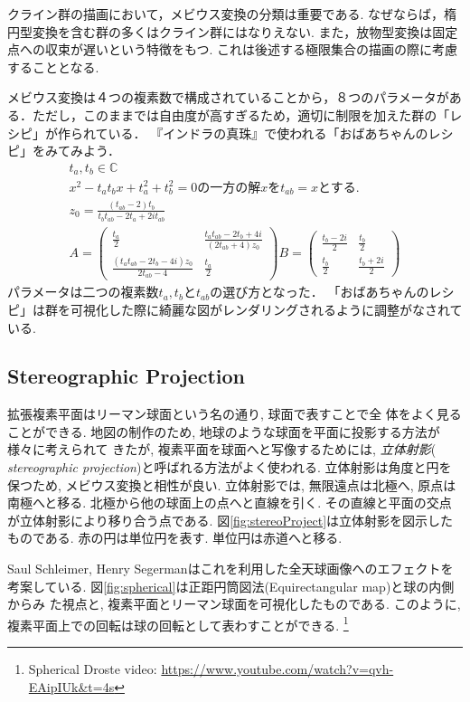 クライン群の描画において，メビウス変換の分類は重要である.
なぜならば，楕円型変換を含む群の多くはクライン群にはなりえない.
また，放物型変換は固定点への収束が遅いという特徴をもつ.
これは後述する極限集合の描画の際に考慮することとなる.

メビウス変換は４つの複素数で構成されていることから，８つのパラメータがある．ただし，このままでは自由度が高すぎるため，適切に制限を加えた群の「レシピ」が作られている．
『インドラの真珠』で使われる「おばあちゃんのレシピ」をみてみよう．
\begin{eqnarray*}
 t_a, t_b \in \mathbb{C} \\
 x^2 - t_a t_b x + t_a^2 + t_b^2 = 0 \text{の一方の解}x\text{を}t_{ab} = x \text{とする. }\\
 z_0 = \frac{(t_{ab} -2)t_b}{t_b t_{ab} - 2 t_a + 2it_{ab}}\\
 A = \left(
      \begin{array}{ccc}
       \frac{t_a}{2} & \frac{t_a t_{ab} - 2 t_b + 4i}{(2 t_{ab} + 4)z_0} \\
       \frac{(t_a t_{ab} - 2 t_b -4i)z_0}{2 t_{ab} - 4} & \frac{t_a}{2}
      \end{array}
     \right)
 B = \left(
      \begin{array}{ccc}
       \frac{t_b - 2i}{2} & \frac{t_b}{2} \\
       \frac{t_b}{2} & \frac{t_b + 2i}{2}
      \end{array}
     \right)
\end{eqnarray*}
パラメータは二つの複素数$t_a, t_b$と$t_{ab}$の選び方となった．
「おばあちゃんのレシピ」は群を可視化した際に綺麗な図がレンダリングされるように調整がなされている.

\subsection{Stereographic Projection}

拡張複素平面はリーマン球面という名の通り, 球面で表すことで全
体をよく見ることができる.
地図の制作のため, 地球のような球面を平面に投影する方法が様々に考えられて
きたが, 複素平面を球面へと写像するためには, \emph{立体射影}({\it
stereographic projection})と呼ばれる方法がよく使われる.
立体射影は角度と円を保つため, メビウス変換と相性が良い.
立体射影では, 無限遠点は北極へ, 原点は南極へと移る.
北極から他の球面上の点へと直線を引く.
その直線と平面の交点が立体射影により移り合う点である.
図\ref{fig:stereoProject}は立体射影を図示したものである.
赤の円は単位円を表す. 単位円は赤道へと移る.

Saul Schleimer, Henry Segermanはこれを利用した全天球画像へのエフェクトを
考案している\cite{spherical}.
図\ref{fig:spherical}は正距円筒図法(Equirectangular map)と球の内側からみ
た視点と, 複素平面とリーマン球面を可視化したものである.
このように, 複素平面上での回転は球の回転として表わすことができる.
\footnote{Spherical Droste video: \url{https://www.youtube.com/watch?v=qvh-EAipIUk\&t=4s}}

